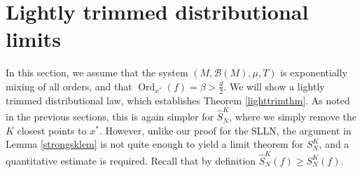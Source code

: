 \documentclass[11pt,twoside,a4paper,reqno]{amsart}
\newcommand{\Ord}{\operatorname{Ord}}
\begin{document}
\section{Lightly trimmed distributional limits}\label{LgTrDL}

In this section, we assume that the system $(M, \mathcal{B}(M), \mu, T)$ is exponentially mixing of all orders, and that $\Ord_{x^*}(f) = \beta >\frac{d}{2}$. We will show a lightly trimmed distributional law, which establishes Theorem \ref{lighttrimthm}. As noted in the previous sections, this is again simpler for $\hat{S}_N^K$, where we simply remove the $K$ closest points to $x^*$. However, unlike our proof for the SLLN, the argument in Lemma \ref{strongsklem} is not quite enough to yield a limit theorem for $S_N^K$, and a quantitative estimate is required. Recall that by definition $\hat{S}_N^K(f)\geq S_N^K(f)$.
\end{document}

